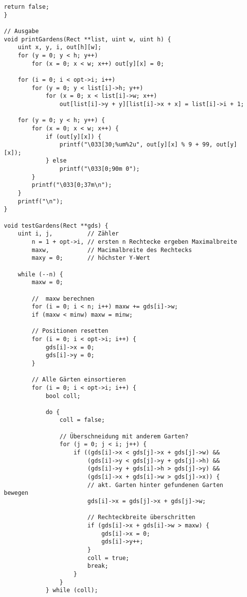 \documentclass[a4paper,10pt,ngerman]{scrartcl}
\begin{document}
\begin{lstlisting}[frame=single]
    return false;
}

// Ausgabe
void printGardens(Rect **list, uint w, uint h) {
    uint x, y, i, out[h][w];
    for (y = 0; y < h; y++)
        for (x = 0; x < w; x++) out[y][x] = 0;

    for (i = 0; i < opt->i; i++)
        for (y = 0; y < list[i]->h; y++)
            for (x = 0; x < list[i]->w; x++)
                out[list[i]->y + y][list[i]->x + x] = list[i]->i + 1;

    for (y = 0; y < h; y++) {
        for (x = 0; x < w; x++) {
            if (out[y][x]) {
                printf("\033[30;%um%2u", out[y][x] % 9 + 99, out[y][x]);
            } else
                printf("\033[0;90m 0");
        }
        printf("\033[0;37m\n");
    }
    printf("\n");
}

void testGardens(Rect **gds) {
    uint i, j,          // Zähler
        n = 1 + opt->i, // ersten n Rechtecke ergeben Maximalbreite
        maxw,           // Macimalbreite des Rechtecks
        maxy = 0;       // höchster Y-Wert

    while (--n) {
        maxw = 0;

        //  maxw berechnen
        for (i = 0; i < n; i++) maxw += gds[i]->w;
        if (maxw < minw) maxw = minw;

        // Positionen resetten
        for (i = 0; i < opt->i; i++) {
            gds[i]->x = 0;
            gds[i]->y = 0;
        }

        // Alle Gärten einsortieren
        for (i = 0; i < opt->i; i++) {
            bool coll;

            do {
                coll = false;

                // Überschneidung mit anderem Garten?
                for (j = 0; j < i; j++) {
                    if ((gds[i]->x < gds[j]->x + gds[j]->w) &&
                        (gds[i]->y < gds[j]->y + gds[j]->h) &&
                        (gds[i]->y + gds[i]->h > gds[j]->y) &&
                        (gds[i]->x + gds[i]->w > gds[j]->x)) {
                        // akt. Garten hinter gefundenen Garten bewegen
                        gds[i]->x = gds[j]->x + gds[j]->w;

                        // Rechteckbreite überschritten
                        if (gds[i]->x + gds[i]->w > maxw) {
                            gds[i]->x = 0;
                            gds[i]->y++;
                        }
                        coll = true;
                        break;
                    }
                }
            } while (coll);


\end{lstlisting}
\end{document}
